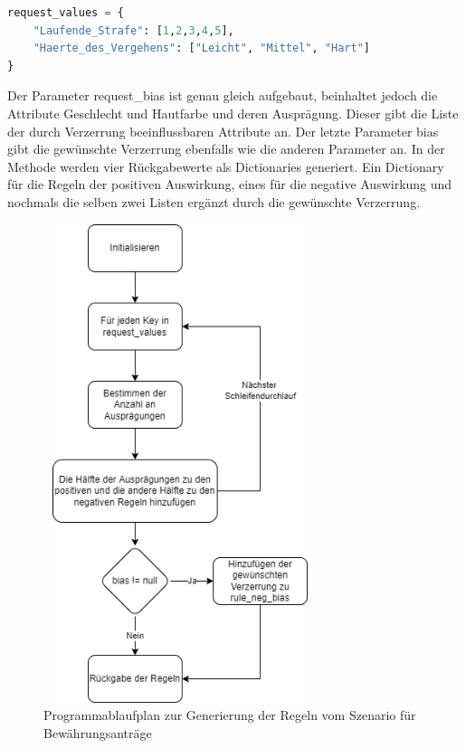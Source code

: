 \begin{onehalfspace}
\begin{lstlisting}[language=Python,label={lst:RequestValues},caption=Codezeilen zum Erstellen eines Dictionary mit den zur Bewertung relevanten Attributen]
request_values = {
    "Laufende_Strafe": [1,2,3,4,5],
    "Haerte_des_Vergehens": ["Leicht", "Mittel", "Hart"]
}
\end{lstlisting}
Der Parameter \glqq{}request\_bias\grqq{} ist genau gleich aufgebaut, beinhaltet jedoch die Attribute Geschlecht und Hautfarbe und deren Ausprägung. Dieser gibt die Liste der durch Verzerrung beeinflussbaren Attribute an. Der letzte Parameter \glqq{}bias\grqq{} gibt die gewünschte Verzerrung ebenfalls wie die anderen Parameter an. 
In der Methode werden vier Rückgabewerte als Dictionaries generiert. Ein Dictionary für die Regeln der positiven Auswirkung, eines für die negative Auswirkung und nochmals die selben zwei Listen ergänzt durch die gewünschte Verzerrung. 
\begin{figure}[h]
    \centering
    \includegraphics[width=8cm,height=14cm]{Diagramme/Sz1_Regeln.drawio.png}
    \caption{Programmablaufplan zur Generierung der Regeln vom Szenario für Bewährungsanträge}
    \label{fig:Sz1Regeln}
\end{figure}\\

\end{onehalfspace}
